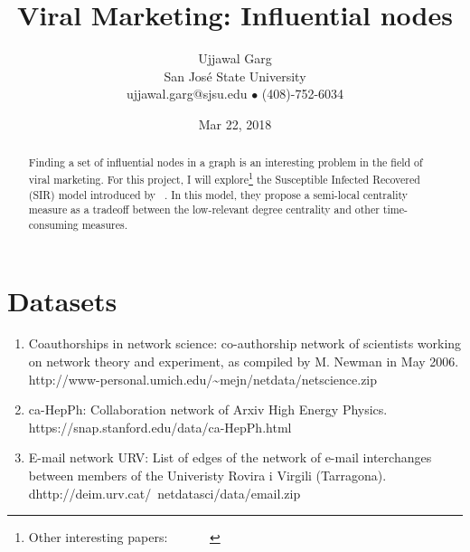 \documentclass{article}
\title{Viral Marketing: Influential nodes}
\author{
	Ujjawal Garg \\
	San Jos\'{e} State University \\
	ujjawal.garg@sjsu.edu $\bullet$ (408)-752-6034
	}
\date{Mar 22, 2018}
\begin{document}
\maketitle

\begin{abstract}
\noindent %
Finding a set of influential nodes in a graph is an interesting problem in the field of viral marketing. For this project, I will explore\footnote{Other interesting papers: ~\cite{kempe} ~\cite{liu} ~\cite{wang} ~\cite{richardson}} the Susceptible Infected Recovered (SIR) model introduced by ~\cite{chen}. In this model, they propose a semi-local centrality measure as a tradeoff between the low-relevant degree centrality and other time-consuming measures.
\end{abstract}

\section*{Datasets}
\begin{enumerate}
\item Coauthorships in network science: co-authorship network of scientists working on network theory and experiment, as compiled by M. Newman in May 2006. http://www-personal.umich.edu/{\textasciitilde}mejn/netdata/netscience.zip
\item ca-HepPh: Collaboration network of Arxiv High Energy Physics. https://snap.stanford.edu/data/ca-HepPh.html
\item E-mail network URV: List of edges of the network of e-mail interchanges between members of the Univeristy Rovira i Virgili (Tarragona).  dhttp://deim.urv.cat/~netdatasci/data/email.zip
\end{enumerate}








\end{document}
